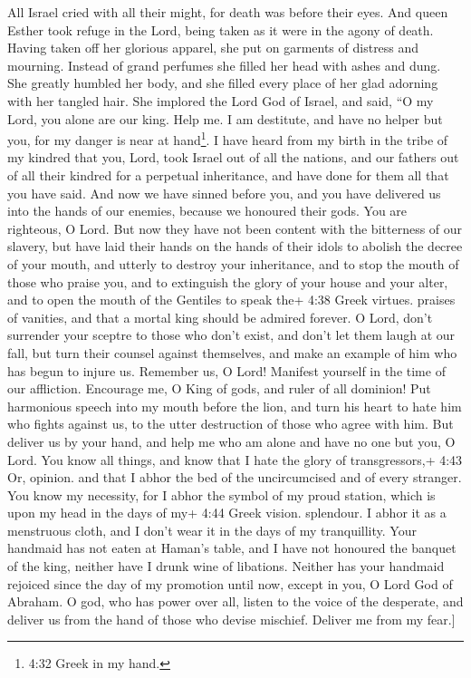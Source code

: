  All Israel cried with all their might, for death was
before their eyes.  And queen Esther took refuge in the
Lord, being taken as it were in the agony of death.  Having
taken off her glorious apparel, she put on garments of distress and
mourning. Instead of grand perfumes she filled her head with ashes and
dung. She greatly humbled her body, and she filled every place of her
glad adorning with her tangled hair.  She implored the Lord
God of Israel, and said, ``O my Lord, you alone are our king. Help me. I
am destitute, and have no helper but you,  for my danger is
near at hand\footnote{4:32 Greek in my hand.}.  I have
heard from my birth in the tribe of my kindred that you, Lord, took
Israel out of all the nations, and our fathers out of all their kindred
for a perpetual inheritance, and have done for them all that you have
said.  And now we have sinned before you, and you have
delivered us into the hands of our enemies,  because we
honoured their gods. You are righteous, O Lord.  But now
they have not been content with the bitterness of our slavery, but have
laid their hands on the hands of their idols  to abolish
the decree of your mouth, and utterly to destroy your inheritance, and
to stop the mouth of those who praise you, and to extinguish the glory
of your house and your alter,  and to open the mouth of the
Gentiles to speak the+ 4:38 Greek virtues. praises of vanities, and that
a mortal king should be admired forever.  O Lord, don't
surrender your sceptre to those who don't exist, and don't let them
laugh at our fall, but turn their counsel against themselves, and make
an example of him who has begun to injure us.  Remember us,
O Lord! Manifest yourself in the time of our affliction. Encourage me, O
King of gods, and ruler of all dominion!  Put harmonious
speech into my mouth before the lion, and turn his heart to hate him who
fights against us, to the utter destruction of those who agree with him.
 But deliver us by your hand, and help me who am alone and
have no one but you, O Lord.  You know all things, and know
that I hate the glory of transgressors,+ 4:43 Or, opinion. and that I
abhor the bed of the uncircumcised and of every stranger. 
You know my necessity, for I abhor the symbol of my proud station, which
is upon my head in the days of my+ 4:44 Greek vision. splendour. I abhor
it as a menstruous cloth, and I don't wear it in the days of my
tranquillity.  Your handmaid has not eaten at Haman's
table, and I have not honoured the banquet of the king, neither have I
drunk wine of libations.  Neither has your handmaid
rejoiced since the day of my promotion until now, except in you, O Lord
God of Abraham.  O god, who has power over all, listen to
the voice of the desperate, and deliver us from the hand of those who
devise mischief. Deliver me from my fear.{]}

